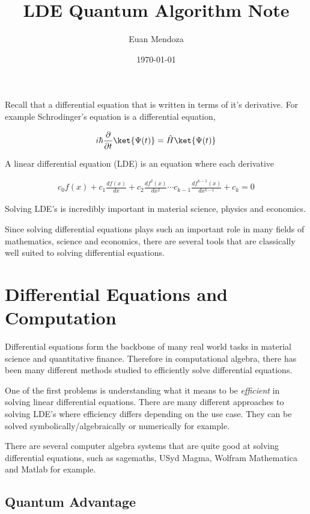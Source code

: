 \documentclass[11pt]{article}
\author{Euan Mendoza}
\date{\today}
\title{LDE Quantum Algorithm Note}
\begin{document}
\maketitle
\tableofcontents

Recall that a differential equation that is written in terms of it's derivative. For example Schrodinger's equation is a differential equation,

\begin{align}
i\hbar \frac{\partial}{\partial t} \ket{\Psi(t)} = \hat{H}\ket{\Psi(t)}
\end{align}

A linear differential equation (LDE) is an equation where each derivative

\begin{align}
c_{0}f(x) + c_{1}\frac{df(x)}{dx} + c_{2}\frac{df^{2}(x)}{dx^{2}}\cdots c_{k-1}\frac{df^{k-1}(x)}{dx^{k-1}} + c_{k} = 0
\end{align}

Solving LDE's is incredibly important in material science, physics and economics.

Since solving differential equations plays such an important role in many fields of mathematics, science and economics, there are several tools that are classically well suited to solving differential equations.
\section{Differential Equations and Computation}
\label{sec:orgd3a1355}

Differential equations form the backbone of many real world tasks in material science and quantitative finance. Therefore in computational algebra, there has been many different methods studied to efficiently solve differential equations. 

One of the first problems is understanding what it means to be \emph{efficient} in solving linear differential equations. There are many different approaches to solving LDE's where efficiency differs depending on the use case. They can be solved symbolically/algebraically or numerically for example.

There are several computer algebra systems that are quite good at solving differential equations, such as sagemaths, USyd Magma, Wolfram Mathematica and Matlab for example.
\subsection{Quantum Advantage}
\label{sec:org12f2ce3}
\end{document}

